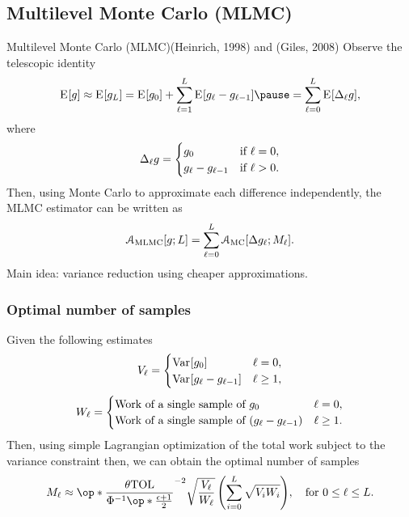 \subsection{Multilevel Monte Carlo (MLMC)}
\begin{frame}{Multilevel Monte Carlo (MLMC){\quad \tiny (Heinrich, 1998) and (Giles, 2008)}}
  Observe the telescopic identity
  \[
    \E{\func} \approx \E{\func_{L}} = \E{\func_{0}} +
    \sum_{{\ell}=1}^{L} \E{\func_{\ell} -
      \func_{{\ell - 1}}} \pause
= \sum_{{\ell}=0}^{{L}} \E{ \Delta_\ell \func}, \]
where
  \begin{align*}
    \Delta_\ell g = \begin{cases}
      g_{0} & \text{if } \ell=0, \\
      g_{{\ell}} -   g_{{\ell-1}} & \text{if } \ell> 0.
      \end{cases}
    \end{align*}
    \pause Then, using Monte Carlo to approximate each difference independently, the
    MLMC estimator can be written as
    \begin{align*}
      \estmlmc{\func ; L} = \sum_{{\ell}=0}^{{L}} \estmc{\Delta
      \func_\ell ; M_\ell}.
    \end{align*}
    Main idea: variance reduction using cheaper approximations.
\end{frame}

\begin{frame}\frametitle{Optimal number of samples}
Given the following estimates
\begin{equation*}
  V_\ell = \begin{cases} {\ensuremath{\mathrm{Var}}\mspace{-2mu}\left[g_{0}\right]} & \ell = 0, \\
{\mathrm{Var}\mspace{-2mu}\left[g_{{\ell}} - g_{{\ell-1}}\right]} & \ell \geq 1, \\
\end{cases}
\end{equation*}
\begin{equation*}
  W_\ell = \begin{cases} \text{Work of a single sample of } {g_{0}} & \ell = 0, \\
\text{Work of a single sample of } (g_{{\ell}} - g_{{\ell-1}}) & \ell \geq 1. \\
\end{cases}
\end{equation*}
Then, using simple Lagrangian optimization of the total work subject to
the variance constraint then, we can obtain the optimal number of samples
\[ M_\ell \approx \op*{\frac{\theta
      \tol}{\Phi^{-1}\op*{\frac{\epsilon + 1}{2}}}}^{-2}{
    \sqrt{\frac{V_\ell}{W_\ell}}\left(\sum_{i=0}^L \sqrt{V_i
        W_i}\right) },\quad \text{for }0\le \ell \le L. \]
\end{frame}


